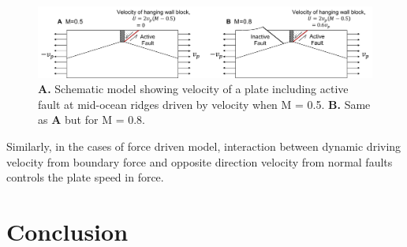 \documentclass[letterpaper,12pt,notitle]{memphisthesis}                     %
\begin{document}
\begin{figure}[!htb]
	\centering
	\includegraphics[width=0.99\linewidth]{./figs/hangingwall.pdf}
	\caption{\textbf{A.} Schematic model showing velocity of a plate including active fault at mid-ocean ridges driven by velocity when M = 0.5. \textbf{B.} Same as \textbf{A} but for M = 0.8. }
	\label{fig:hangingwall}
\end{figure}


Similarly, in the cases of force driven model, interaction between dynamic driving velocity from boundary force and opposite direction velocity from normal faults controls the plate speed in force. 


\chapter{Conclusion}

\end{document}
